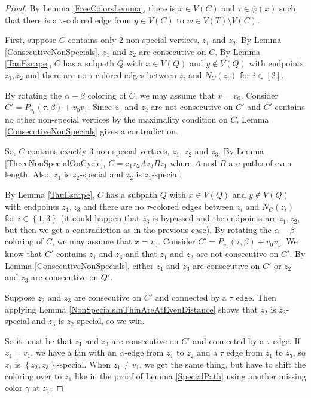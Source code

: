 \documentclass[12pt]{amsart}
\theoremstyle{plain}
\theoremstyle{definition}
\theoremstyle{remark}
\newcommand{\set}[1]{\left\{ #1 \right\}}
\newcommand{\irange}[1]{\left[#1\right]}
\newcommand{\vphn}{\overline{\varphi}}
\begin{document}
\begin{proof}
By Lemma \ref{FreeColorsLemma}, there is $x \in V(C)$ and $\tau \in \vphn(x)$ such that there is a $\tau$-colored edge from $y \in V(C)$ to $w \in V(T) \setminus V(C)$.

First, suppose $C$ contains only 2 non-special vertices, $z_1$ and $z_2$.  By Lemma \ref{ConsecutiveNonSpecials}, $z_1$ and $z_2$ are consecutive on $C$.
By Lemma \ref{TauEscape}, $C$ has a subpath $Q$ with $x \in V(Q)$ and $y \not \in V(Q)$ with endpoints $z_1,z_2$ and there are no 
$\tau$-colored edges between $z_i$ and $N_C(z_i)$ for $i \in \irange{2}$.  

By rotating the $\alpha-\beta$ coloring of $C$, we may assume that $x = v_0$. Consider $C' = P_{v_1}(\tau, \beta) + v_0v_1$.  Since $z_1$ and $z_2$ are not consecutive on $C'$ and
$C'$ contains no other non-special vertices by the maximality condition on $C$, Lemma \ref{ConsecutiveNonSpecials} gives a contradiction.

So, $C$ contains exactly 3 non-special vertices, $z_1$, $z_2$ and $z_3$.  By Lemma \ref{ThreeNonSpecialOnCycle}, $C = z_1z_2Az_3Bz_1$ where $A$ and $B$ are paths of even length.  Also,
$z_1$ is $z_2$-special and $z_2$ is $z_1$-special.  

By Lemma \ref{TauEscape}, $C$ has a subpath $Q$ with $x \in V(Q)$ and $y \not \in V(Q)$ with endpoints $z_1,z_3$ and there are no 
$\tau$-colored edges between $z_i$ and $N_C(z_i)$ for $i \in \set{1,3}$ (it could happen that $z_3$ is bypassed and the endpoints are $z_1, z_2$, but then we get a contradiction as in the previous case).
By rotating the $\alpha-\beta$ coloring of $C$, we may assume that $x = v_0$.  
Consider $C' = P_{v_1}(\tau, \beta) + v_0v_1$.  We know that $C'$ contains $z_1$ and $z_3$ and that $z_1$ and $z_2$ are not consecutive on $C'$.  By Lemma \ref{ConsecutiveNonSpecials}, either $z_1$ and $z_3$ are consecutive on 
$C'$ or $z_2$ and $z_3$ are consecutive on $Q'$.

Suppose $z_2$ and $z_3$ are consecutive on $C'$ and connected by a $\tau$ edge.  Then applying Lemma \ref{NonSpecialsInThinAreAtEvenDistance} shows that $z_2$ is $z_3$-special and $z_3$ is $z_2$-special, so we win.

So it must be that $z_1$ and $z_3$ are consecutive on $C'$ and connected by a $\tau$ edge.  If $z_1 = v_1$, we have a fan with an $\alpha$-edge from $z_1$ to $z_2$ and a $\tau$ edge from $z_1$ to $z_3$, so 
$z_1$ is $\set{z_2,z_3}$-special.  When $z_1 \ne v_1$, we get the same thing, but have to shift the coloring over to $z_1$ like in the proof of Lemma \ref{SpecialPath} using another missing color $\gamma$ at $z_1$.
\end{proof}
\end{document}

